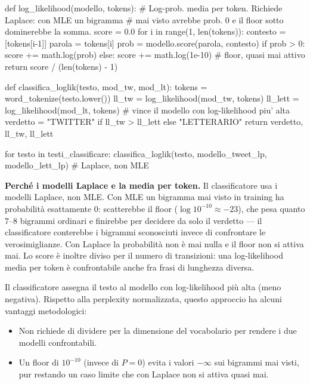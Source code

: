 ﻿\documentclass[12pt,a4paper]{article}
\begin{document}
\begin{pylisting}[title={Calcolo della log-likelihood di una sequenza}]
def log_likelihood(modello, tokens):
    # Log-prob. media per token. Richiede Laplace: con MLE un bigramma
    # mai visto avrebbe prob. 0 e il floor sotto dominerebbe la somma.
    score = 0.0
    for i in range(1, len(tokens)):
        contesto = [tokens[i-1]]
        parola   = tokens[i]
        prob = modello.score(parola, contesto)
        if prob > 0:
            score += math.log(prob)
        else:
            score += math.log(1e-10)  # floor, quasi mai attivo
    return score / (len(tokens) - 1)

def classifica_loglik(testo, mod_tw, mod_lt):
    tokens  = word_tokenize(testo.lower())
    ll_tw   = log_likelihood(mod_tw,   tokens)
    ll_lett = log_likelihood(mod_lt,   tokens)
    # vince il modello con log-likelihood piu' alta
    verdetto = "TWITTER" if ll_tw > ll_lett else "LETTERARIO"
    return verdetto, ll_tw, ll_lett

for testo in testi_classificare:
    classifica_loglik(testo, modello_tweet_lp, modello_lett_lp)  # Laplace, non MLE
\end{pylisting}

\textbf{Perché i modelli Laplace e la media per token.} Il classificatore
usa i modelli Laplace, non MLE. Con MLE un bigramma mai visto in training
ha probabilità esattamente $0$: scatterebbe il floor ($\log 10^{-10}
\approx -23$), che pesa quanto $7$--$8$ bigrammi ordinari e finirebbe per
decidere da solo il verdetto — il classificatore conterebbe i bigrammi
sconosciuti invece di confrontare le verosimiglianze. Con Laplace la
probabilità non è mai nulla e il floor non si attiva mai. Lo score è
inoltre diviso per il numero di transizioni: una log-likelihood media per
token è confrontabile anche fra frasi di lunghezza diversa.

Il classificatore assegna il testo al modello con log-likelihood più alta (meno negativa). Rispetto alla perplexity normalizzata, questo approccio ha alcuni vantaggi metodologici:
\begin{itemize}
  \item Non richiede di dividere per la dimensione del vocabolario per rendere i due modelli confrontabili.
  \item Un floor di $10^{-10}$ (invece di $P=0$) evita i valori $-\infty$ sui bigrammi mai visti, pur restando un caso limite che con Laplace non si attiva quasi mai.
\end{itemize}
\end{document}
